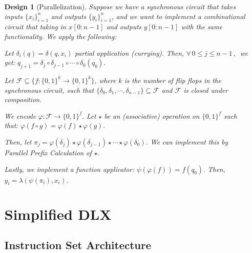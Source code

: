 \documentclass[12pt]{article}
\newcommand{\Forall}[1]{\forall\,{#1}\,,\,}
\newcommand*{\B}{\{0,1\}}
\newtheorem{design}[theorem]{Design}
\begin{document}
\begin{design}[Parallelization]
  Suppose we have a synchronous circuit that takes inputs $\{x_i\}_{i=1}^n$ and outputs $\{y_i\}_{i=1}^n$, and we want to implement a combinational circuit that taking in $x[0:n-1]$ and outputs $y[0:n-1]$ with the same functionality. We apply the following:
  \begin{compactitem}
    \item Let $\delta_i(q)=\delta(q,x_i)$ partial application (currying). Then, $\Forall{0\leq j\leq n-1}$ we get: $q_{j+1}=\delta_j\circ\delta_{j-1}\circ\cdots\circ\delta_0(q_0)$.
    \item Let $\mathcal{F}\subseteq\{f:\B^k\to\B^k\}$, where $k$ is the number of flip flops in the synchronous circuit, such that $\{\delta_0,\delta_1,\cdots,\delta_{n-1}\}\subseteq\mathcal{F}$ and $\mathcal{F}$ is closed under composition.
    \item We encode $\varphi:\mathcal{F}\to\{0,1\}^f$. Let $\star$ be an (associative) operation on $\{0,1\}^f$ such that: $\varphi(f\circ g)=\varphi(f)\star\varphi(g)$.
    \item Then, let $\pi_j=\varphi(\delta_j)\star\varphi(\delta_{j-1})\star\cdots\star\varphi(\delta_0)$. We can implement this by Parallel Prefix Calculation of $\star$.
    \item Lastly, we implement a function applicator: $\psi(\varphi(f))=f(q_0)$. Then, $y_i=\lambda(\psi(\pi_i),x_i)$.
  \end{compactitem}
\end{design}

\pagebreak

\section{Simplified DLX}

\subsection{Instruction Set Architecture}
\end{document}
